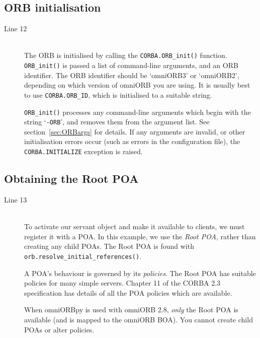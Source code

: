 \documentclass[11pt,twoside,a4paper]{book}
\newcommand{\code}[1]{\texttt{#1}}
\newcommand{\op}[1]{\texttt{#1()}}
\newcommand{\cmdline}[1]{\texttt{#1}}
\newcommand{\term}[1]{\textit{#1}}
\newcommand{\dsc}{\discretionary{}{}{}}
\begin{document}
\subsection{ORB initialisation}

\begin{description}

\item[Line 12]\mbox{}\\
%
The ORB is initialised by calling the \op{CORBA.ORB\_init} function.
\op{ORB\_\dsc{}init} is passed a list of command-line arguments, and
an ORB identifier. The ORB identifier should be `omniORB3' or
`omniORB2', depending on which version of omniORB you are using. It is
usually best to use \code{CORBA.ORB\_ID}, which is initialised to a
suitable string.

\op{ORB\_init} processes any command-line arguments which begin with
the string `\cmdline{-ORB}', and removes them from the argument
list. See section~\ref{sec:ORBargs} for details. If any arguments are
invalid, or other initialisation errors occur (such as errors in the
configuration file), the \code{CORBA.INITIALIZE} exception is raised.

\end{description}

\subsection{Obtaining the Root POA}

\begin{description}

\item[Line 13]\mbox{}\\
%
To activate our servant object and make it available to clients, we
must register it with a POA. In this example, we use the \term{Root
POA}, rather than creating any child POAs. The Root POA is found with
\op{orb.resolve\_initial\_\dsc{}references}.

A POA's behaviour is governed by its \term{policies}. The Root POA has
suitable policies for many simple servers. Chapter 11 of the CORBA 2.3
specification \cite{corba23-spec} has details of all the POA policies
which are available.

When omniORBpy is used with omniORB 2.8, \emph{only} the Root POA is
available (and is mapped to the omniORB BOA). You cannot create child
POAs or alter policies.

\end{description}
\end{document}
